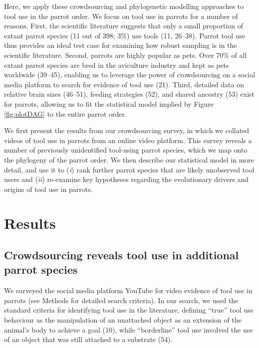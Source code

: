 \documentclass[
  man,floatsintext]{apa6}
\begin{document}
Here, we apply these crowdsourcing and phylogenetic modelling approaches to tool
use in the parrot order. We focus on tool use in parrots for a number of
reasons. First, the scientific literature suggests that only a small proportion
of extant parrot species (11 out of 398; 3\%) use tools
(11, 26--38). Parrot tool use
thus provides an ideal test case for examining how robust sampling is in the
scientific literature. Second, parrots are highly popular as pets. Over 70\% of
all extant parrot species are bred in the aviculture industry and kept as pets
worldwide (39--45), enabling us to leverage the power of crowdsourcing on a social
media platform to search for evidence of tool use (21). Third, detailed
data on relative brain sizes (46--51), feeding strategies (52), and
shared ancestry (53) exist for parrots, allowing us to fit the
statistical model implied by Figure \ref{fig:plotDAG} to the entire parrot
order.

We first present the results from our crowdsourcing survey, in which we collated
videos of tool use in parrots from an online video platform. This survey reveals
a number of previously unidentified tool-using parrot species, which we map onto
the phylogeny of the parrot order. We then describe our statistical model in
more detail, and use it to (\emph{i}) rank further parrot species that are likely
unobserved tool users and (\emph{ii}) re-examine key hypotheses regarding the
evolutionary drivers and origins of tool use in parrots.

\hypertarget{results}{%
\section{Results}\label{results}}

\hypertarget{crowdsourcing-reveals-tool-use-in-additional-parrot-species}{%
\subsection{Crowdsourcing reveals tool use in additional parrot species}\label{crowdsourcing-reveals-tool-use-in-additional-parrot-species}}

We surveyed the social media platform YouTube for video evidence of tool use in
parrots (see Methods for detailed search criteria). In our search, we used the
standard criteria for identifying tool use in the literature, defining ``true''
tool use behaviour as the manipulation of an unattached object as an extension
of the animal's body to achieve a goal (10), while ``borderline'' tool
use involved the use of an object that was still attached to a substrate
(54).
\end{document}
